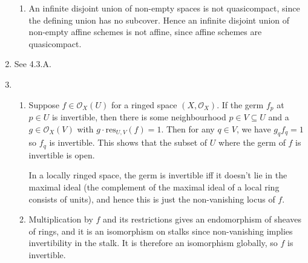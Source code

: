 \documentclass{report}
\newcommand{\res}{{\mathrm{res}}} %
\renewcommand{\O}{\mathscr{O}} %
\begin{document}
\begin{enumerate}[label=\textbf{4.3.\Alph*.}]
\begin{enumerate}[label=(\alph*)]
		      \item An infinite disjoint union of non-empty spaces is not
		            quasicompact, since the defining union has no subcover. Hence
		            an infinite disjoint union of non-empty affine schemes is not
		            affine, since affine schemes are quasicompact.
	      \end{enumerate}

	\item See 4.3.A.

	\item
	      \begin{enumerate}[label=(\alph*)]
		      \item Suppose $f\in\O_X(U)$ for a ringed space $(X,\O_X)$. If the
		            germ $f_p$ at $p\in U$ is invertible, then there is some
		            neighbourhood $p\in V\subseteq U$ and a $g\in\O_X(V)$ with
		            $g\cdot\res_{U,V}(f)=1$. Then for any $q\in V$, we have
		            $g_qf_q=1$ so $f_q$ is invertible. This shows that the subset of
		            $U$ where the germ of $f$ is invertible is open.

		            In a locally ringed space, the germ is invertible iff it doesn't
		            lie in the maximal ideal (the complement of the maximal ideal of
		            a local ring consists of units), and hence this is just the
		            non-vanishing locus of $f$.

		      \item Multiplication by $f$ and its restrictions gives an
		            endomorphism of sheaves of rings, and it is an isomorphism on
		            stalks since non-vanishing implies invertibility in the stalk.
		            It is therefore an isomorphism globally, so $f$ is invertible.
	      \end{enumerate}
\end{enumerate}
\end{document}

